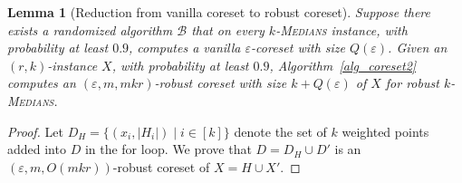 \documentclass[11pt,letterpaper]{article}
\newtheorem{lemma}[theorem]{Lemma}
\theoremstyle{definition}
\newcommand{\eps}{\varepsilon}
\newcommand{\ProblemName}[1]{\textsc{#1}}
\newcommand{\kMedian}{\ProblemName{$k$-Medians}\xspace}
\begin{document}
\begin{lemma}[Reduction from vanilla coreset to robust coreset] 
\label{lemma_innergroup} Suppose there exists a randomized algorithm $\mathcal{B}$ that on every \kMedian instance, with probability at least $0.9$, computes a vanilla $\eps$-coreset with size $Q(\eps)$.
Given an $(r,k)$-instance $X$, with probability at least $0.9$, Algorithm~\ref{alg_coreset2} computes an $(\eps,m,mkr)$-robust coreset with size $k+Q(\eps)$ of $X$ for robust \kMedian.
\end{lemma}
\begin{proof} %
	
Let $D_H=\{(x_i,|H_i|)\mid i\in [k]\}$ denote the set of $k$ weighted points added into $D$ in the for loop. 
%
We prove that $D=D_H\cup D'$ is an $(\eps,m,O(mkr))$-robust coreset of $X=H\cup X'$.
	


\end{proof}
\end{document}
